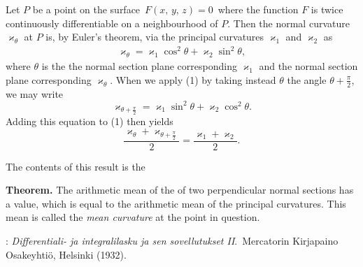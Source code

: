 \documentclass[12pt]{article}
\theoremstyle{definition}
\begin{document}
Let $P$ be a point on the surface \,$F(x,\,y,\,z) = 0$\, where the function $F$ is twice continuously differentiable on a neighbourhood of $P$.  Then the normal curvature $\varkappa_\theta$ at $P$ is, by Euler's theorem,  via the principal curvatures $\varkappa_1$ and $\varkappa_2$ as
\begin{align}
     \varkappa_\theta = \varkappa_1\cos^2\theta+\varkappa_2\sin^2\theta,
\end{align}
where $\theta$ is the  the normal section plane corresponding $\varkappa_1$ and the normal section plane corresponding $\varkappa_\theta$.  When we apply (1) by taking instead $\theta$ the angle $\theta\!+\!\frac{\pi}{2}$, we may write
   $$\varkappa_{\theta+\frac{\pi}{2}} = 
\varkappa_1\sin^2\theta+\varkappa_2\cos^2\theta.$$
Adding this equation to (1) then yields
   $$\frac{\varkappa_\theta+\varkappa_{\theta+\frac{\pi}{2}}}{2} = 
\frac{\varkappa_1+\varkappa_2}{2}.$$

The contents of this result is the

\textbf{Theorem.}  The arithmetic mean of the  of two perpendicular normal sections has a  value, which is equal to the arithmetic mean of the principal curvatures.  This mean is called the {\em mean curvature} at the point in question.

\begin{thebibliography}{8}
: {\em Differentiali- ja integralilasku
ja sen sovellutukset II}.\, Mercatorin Kirjapaino Osakeyhti\"o, Helsinki (1932).
\end{thebibliography}
\end{document}
